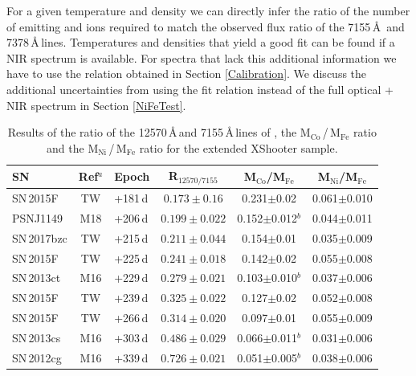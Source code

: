 \documentclass[fleqn,usenatbib]{mnras}
\begin{document}
For a given temperature and density we can directly infer the ratio of the number of emitting  and  ions required to match the observed flux ratio of the 7155\,\AA\, and 7378\,\AA\,lines. Temperatures and densities that yield a good fit can be found if a NIR spectrum is available. For spectra that lack this additional information we have to use the relation obtained in Section \ref{Calibration}. We discuss the additional uncertainties from using the fit relation instead of the full optical + NIR spectrum in Section \ref{NiFeTest}.


\begin{table}
	\centering
	\scriptsize
	\caption{Results of the ratio of the 12570\,\AA\,and 7155\,\AA\,lines of , the M$_{\text{Co}}$\,/\,M$_{\text{Fe}}$ ratio and the M$_{\text{Ni}}$\,/\,M$_{\text{Fe}}$ ratio for the extended XShooter sample.}
	\label{tab:LineRatio}
    \begin{tabular}{lclccc}
    	\hline 
    	SN 		  & Ref$^a$ & Epoch & R$_{12570/7155}$ &	M$_{\text{Co}}$/M$_{\text{Fe}}$ & M$_{\text{Ni}}$/M$_{\text{Fe}}$\\
		\hline  
		SN\,2015F   & TW & +181\,d & $0.173\pm0.16$ & 0.231$\pm$0.02 & 0.061$\pm$0.010\\
    	PSNJ1149  & M18 & +206\,d & $0.199\pm0.022$ & 0.152$\pm$0.012$^b$ & 0.044$\pm$0.011\\
    	SN\,2017bzc & TW & +215\,d & $0.211\pm0.044$ & 0.154$\pm$0.01 &0.035$\pm$0.009\\
        SN\,2015F   & TW & +225\,d & $0.241\pm0.018$ & 0.142$\pm$0.02 & 0.055$\pm$0.008\\
        SN\,2013ct  & M16 & +229\,d & $0.279\pm0.021$ & 0.103$\pm$0.010$^b$ & 0.037$\pm$0.006\\
        SN\,2015F   & TW & +239\,d & $0.325\pm0.022$ & 0.127$\pm$0.02 & 0.052$\pm$0.008\\
        SN\,2015F   & TW & +266\,d & $0.314\pm0.020$ & 0.097$\pm$0.01 & 0.055$\pm$0.009\\
        SN\,2013cs  & M16 & +303\,d & $0.486\pm0.029$ & 0.066$\pm$0.011$^b$ & 0.031$\pm$0.006\\
        SN\,2012cg  & M16 & +339\,d & $0.726\pm0.021$ & 0.051$\pm$0.005$^b$ & 0.038$\pm$0.006\\

\end{tabular}
\end{table}
\end{document}
